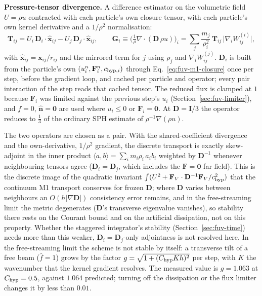 \textbf{Pressure-tensor divergence.} A difference estimator on the
volumetric field $U = \rho u$ contracted with each particle's own
closure tensor, with each particle's own kernel derivative and a
$1/\rho^2$ normalisation:
\begin{equation}
  \mathbf T_{ij} = U_i\,\mathbf D_i\cdot\hat{\mathbf x}_{ij}
                 - U_j\,\mathbf D_j\cdot\hat{\mathbf x}_{ij} , \qquad
  \mathbf G_i \equiv
  \Big(\tfrac{1}{\rho}\nabla\cdot(\mathbf D\,\rho u)\Big)_i
    = \sum_j \frac{m_j}{\rho_i^2}\,
      \mathbf T_{ij}\,\big|\nabla_i W_{ij}^{(i)}\big| ,
  \label{eq:fuv-grad-op}
\end{equation}
with $\hat{\mathbf x}_{ij} = \mathbf x_{ij}/r_{ij}$ and the mirrored
term for $j$ using $\rho_j$ and $\nabla_i W_{ij}^{(j)}$. $\mathbf D_i$ is
built from the particle's own $(u_i^n, \mathbf F_i^n, c_{{\rm hyp},i})$
through Eq.~\ref{eq:fuv-m1-closure} once per step, before the gradient
loop, and cached per particle and operator; every pair interaction of the
step reads that cached tensor.
The reduced flux is clamped at $1$ because $\mathbf F_i$
was limited against the previous step's $u_i$ (Section~\ref{sec:fuv-limiter}),
and $f = 0$, $\hat{\mathbf n} = \mathbf 0$ are used where $u_i\le0$ or
$\mathbf F_i = \mathbf 0$. At $\mathbf D = \mathbf I/3$ the operator
reduces to $\tfrac13$ of the ordinary SPH estimate of
$\rho^{-1}\nabla(\rho u)$.

The two operators are chosen as a pair. With the shared-coefficient
divergence and the own-derivative, $1/\rho^2$ gradient, the discrete
transport is exactly skew-adjoint in the inner product $\langle a, b
\rangle = \sum_i m_i\rho_i\,a_i b_i$ weighted by $\mathbf D^{-1}$
whenever neighbouring tensors agree ($\mathbf D_i = \mathbf D_j$, which
includes the $\mathbf F = \mathbf 0$ far field). This is the discrete
image of the quadratic invariant $\int (U^2 + \mathbf F_V\cdot\mathbf
D^{-1}\mathbf F_V/c_{\rm hyp}^2)$ that the continuum M1 transport
conserves for frozen $\mathbf D$; where $\mathbf D$ varies between
neighbours an $O(h|\nabla\mathbf D|)$ consistency error remains, and in
the free-streaming limit the metric degenerates ($\mathbf D$'s
transverse eigenvalue vanishes), so stability there rests on the Courant
bound and on the artificial dissipation, not on this property. Whether
the staggered integrator's stability (Section~\ref{sec:fuv-time}) needs
more than this weaker, $\mathbf D_i=\mathbf D_j$-only adjointness is not
resolved here. In the free-streaming limit the scheme is not stable by
itself: a transverse tilt of a free beam ($\hat f = 1$) grows by the
factor $g = \sqrt{1 + (C_{\rm hyp} K h)^2}$ per step, with $K$ the
wavenumber that the kernel gradient resolves. The measured value is
$g = 1.063$ at $C_{\rm hyp} = 0.5$, against $1.064$ predicted; turning
off the dissipation or the flux limiter changes it by less than $0.01$.

